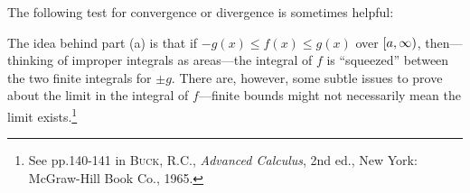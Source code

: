 \newpage
The following test for convergence or divergence is sometimes helpful:


The idea behind part (a) is that if $-g(x) \le f(x) \le g(x)$ over
$\lbrack a,\infty )$, then---thinking of improper integrals as areas---the
integral of $f$ is ``squeezed'' between the two finite integrals for $\pm g$.
There are, however, some subtle issues to prove about the limit in the integral
of $f$---finite bounds might not necessarily mean the limit exists.\footnote{See
pp.140-141 in \textsc{Buck, R.C.}, \emph{Advanced Calculus}, 2nd ed., New York:
McGraw-Hill Book Co., 1965.}

